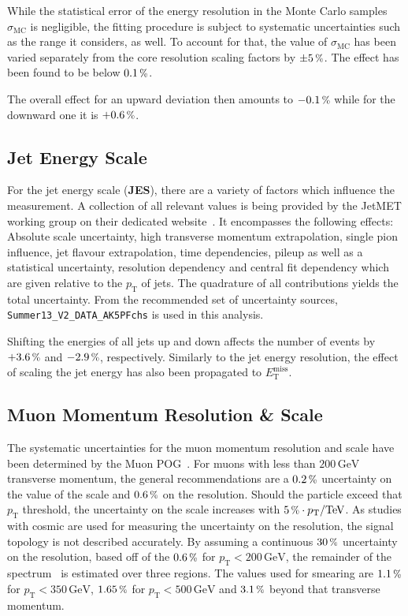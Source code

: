 While the statistical error of the energy resolution in the Monte Carlo samples $\sigma_{\text{MC}}$ is negligible, the fitting procedure is subject to systematic uncertainties such as the range it considers, as well. To account for that, the value of $\sigma_{\text{MC}}$ has been varied separately from the core resolution scaling factors by $\pm 5\,\pct$. The effect has been found to be below $0.1\,\pct$.

The overall effect for an upward deviation then amounts to $-0.1\,\pct$ while for the downward one it is $+0.6\,\pct$.


\subsection{Jet Energy Scale}
\label{sec:jes}

For the jet energy scale (\textbf{JES}), there are a variety of factors which influence the measurement. A collection of all relevant values is being provided by the JetMET working group on their dedicated website~\cite{jes}. It encompasses the following effects: Absolute scale uncertainty, high transverse momentum extrapolation, single pion influence, jet flavour extrapolation, time dependencies, pileup as well as a statistical uncertainty, resolution dependency and central fit dependency which are given relative to the $p_{\text{T}}$ of jets. The quadrature of all contributions yields the total uncertainty. From the recommended set of uncertainty sources, \verb+Summer13_V2_DATA_AK5PFchs+ is used in this analysis. 

Shifting the energies of all jets up and down affects the number of events by $+3.6\,\pct$ and $-2.9\,\pct$, respectively. Similarly to the jet energy resolution, the effect of scaling the jet energy has also been propagated to $E_{\text{T}}^{\text{miss}}$.


\subsection{Muon Momentum Resolution \& Scale}
\label{sec:mers}

The systematic uncertainties for the muon momentum resolution and scale have been determined by the Muon POG~\cite{muonid2}. For muons with less than $200\,\text{GeV}$ transverse momentum, the general recommendations are a $0.2\,\pct$ uncertainty on the value of the scale and $0.6\,\pct$ on the resolution. Should the particle exceed that $p_{\text{T}}$ threshold, the uncertainty on the scale increases with $5\,\pct \cdot p_{\text{T}}/\text{TeV}$. As studies with cosmic are used for measuring the uncertainty on the resolution, the signal topology is not described accurately. By assuming a continuous $30\,\pct$ uncertainty on the resolution, based off of the $0.6\,\pct$ for $p_{\text{T}} < 200\,\text{GeV}$, the remainder of the spectrum~\cite{muonptscale} is estimated over three regions. The values used for smearing are $1.1\,\pct$ for $p_{\text{T}} < 350\,\text{GeV}$, $1.65\,\pct$ for $p_{\text{T}} < 500\,\text{GeV}$ and $3.1\,\pct$ beyond that transverse momentum.

